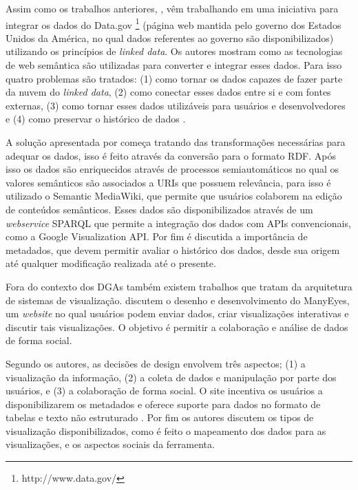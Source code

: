 Assim como os trabalhos anteriores, , vêm trabalhando em uma 
iniciativa para integrar os dados do Data.gov \footnote{ http://www.data.gov/} (página web 
mantida pelo governo dos Estados Unidos da América, no qual dados referentes ao governo são 
disponibilizados) utilizando os princípios de \textit{linked data}. Os autores mostram como 
as tecnologias de web semântica são utilizadas para converter e integrar esses dados. Para 
isso quatro problemas são tratados: (1) como tornar os dados capazes de fazer parte da 
nuvem do \textit{linked data}, (2) como conectar esses dados entre si e com fontes externas, 
(3) como tornar esses dados utilizáveis para usuários e desenvolvedores e (4) como preservar 
o histórico de dados \cite{ding2010data}.

A solução apresentada por  começa tratando das transformações 
necessárias para adequar os dados, isso é feito através da conversão para o formato RDF. 
Após isso os dados são enriquecidos através de processos semiautomáticos no qual os valores 
semânticos são associados a URIs que possuem relevância, para isso é utilizado o Semantic 
MediaWiki, que permite que usuários colaborem na edição de conteúdos semânticos. Esses dados 
são disponibilizados através de um \textit{webservice} SPARQL que permite a integração dos 
dados com APIs convencionais, como a Google Visualization API. Por fim é discutida a 
importância de metadados, que devem permitir avaliar o histórico dos dados, desde sua origem 
até qualquer modificação realizada até o presente.

Fora do contexto dos DGAs também existem trabalhos que tratam da arquitetura de sistemas de 
visualização.  discutem o desenho e desenvolvimento do ManyEyes, um 
\textit{website} no qual usuários podem enviar dados, criar visualizações interativas e 
discutir tais visualizações. O objetivo é permitir a colaboração e análise de dados de forma 
social.

Segundo os autores, as decisões de design envolvem três aspectos; (1) a visualização da 
informação, (2) a coleta de dados e manipulação por parte dos usuários, e (3) a colaboração 
de forma social. O site incentiva os usuários a disponibilizarem os metadados e oferece 
suporte para dados no formato de tabelas e texto não estruturado \cite{viegas2007}. 
Por fim os autores discutem os tipos de visualização disponibilizados, como é feito o 
mapeamento dos dados para as visualizações, e os aspectos sociais da ferramenta.

